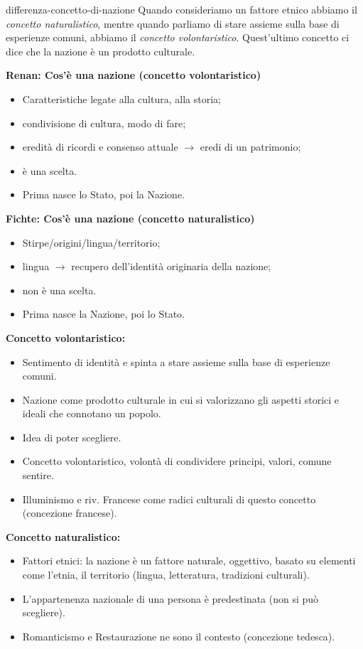 \documentclass[preview]{standalone}
\begin{document}
\begin{snippet}{differenza-concetto-di-nazione}
    Quando consideriamo un fattore etnico abbiamo il \textit{concetto naturalistico},
    mentre quando parliamo di stare assieme sulla base di esperienze comuni, abbiamo il \textit{concetto volontaristico}.
    Quest'ultimo concetto ci dice che la nazione è un prodotto culturale.

    \textbf{Renan: Cos'è una nazione (concetto volontaristico)}
    \begin{itemize}
        \item Caratteristiche legate alla cultura, alla storia;
        \item condivisione di cultura, modo di fare;
        \item eredità di ricordi e consenso attuale \(\rightarrow\) eredi di un patrimonio;
        \item è una scelta.
        \item Prima nasce lo Stato, poi la Nazione.
    \end{itemize}

    \textbf{Fichte: Cos'è una nazione (concetto naturalistico)}
    \begin{itemize}
        \item Stirpe/origini/lingua/territorio;
        \item lingua \(\rightarrow\) recupero dell'identità originaria della nazione;
        \item non è una scelta.
        \item Prima nasce la Nazione, poi lo Stato.
    \end{itemize}

    \textbf{Concetto volontaristico:}
    \begin{itemize}
        \item Sentimento di identità e spinta a stare assieme sulla base di esperienze comuni.
        \item Nazione come prodotto culturale in cui si valorizzano gli aspetti storici e ideali che connotano un popolo.
        \item Idea di poter scegliere.
        \item Concetto volontaristico, volontà di condividere principi, valori, comune sentire.
        \item Illuminismo e riv. Francese come radici culturali di questo concetto (concezione francese).
    \end{itemize}

    \textbf{Concetto naturalistico:}
    \begin{itemize}
        \item Fattori etnici: la nazione è un fattore naturale, oggettivo, basato su elementi come l'etnia, il territorio (lingua, letteratura, tradizioni culturali).
        \item L'appartenenza nazionale di una persona è predestinata (non si può scegliere).
        \item Romanticismo e Restaurazione ne sono il contesto (concezione tedesca).
    \end{itemize}
\end{snippet}
\end{document}
